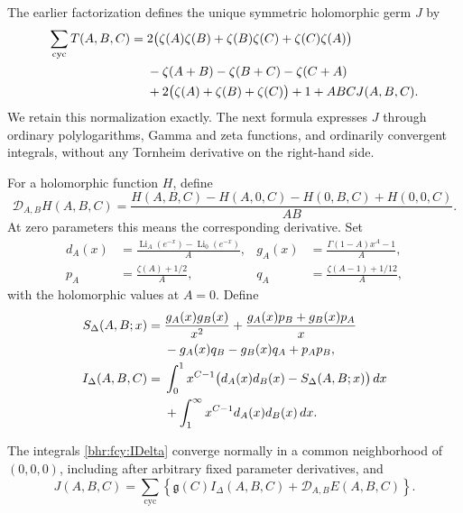 The earlier factorization defines the unique symmetric holomorphic
germ \(J\) by
\begin{align}
 \sum_{\mathrm{cyc}}T(A,B,C)={}&
 2\bigl(\zeta(A)\zeta(B)+\zeta(B)\zeta(C)+\zeta(C)\zeta(A)\bigr)
 \notag\\
 &-\zeta(A+B)-\zeta(B+C)-\zeta(C+A)\notag\\
 &+2\bigl(\zeta(A)+\zeta(B)+\zeta(C)\bigr)+1+ABCJ(A,B,C).
 \label{bhr:fcy:J}
\end{align}
We retain this normalization exactly. The next formula expresses
\(J\) through ordinary polylogarithms, Gamma and zeta functions,
and ordinarily convergent integrals, without any Tornheim derivative
on the right-hand side.

For a holomorphic function \(H\), define
\[
 \mathcal D_{A,B}H(A,B,C)=
 \frac{H(A,B,C)-H(A,0,C)-H(0,B,C)+H(0,0,C)}{AB}.
\]
At zero parameters this means the corresponding derivative. Set
\begin{align*}
 d_A(x)&=\frac{\operatorname{Li}_A(e^{-x})-\operatorname{Li}_0(e^{-x})}{A},&
 g_A(x)&=\frac{\Gamma(1-A)x^A-1}{A},\\
 p_A&=\frac{\zeta(A)+1/2}{A},&
 q_A&=\frac{\zeta(A-1)+1/12}{A},
\end{align*}
with the holomorphic values at \(A=0\). Define
\begin{align}
 S_\Delta(A,B;x)={}&\frac{g_A(x)g_B(x)}{x^2}
 +\frac{g_A(x)p_B+g_B(x)p_A}{x}\notag\\
 &-g_A(x)q_B-g_B(x)q_A+p_Ap_B,
 \label{bhr:fcy:SDelta}\\
 I_\Delta(A,B,C)={}&\int_0^1x^{C-1}
 \bigl(d_A(x)d_B(x)-S_\Delta(A,B;x)\bigr)\,dx\notag\\
 &+\int_1^\infty x^{C-1}d_A(x)d_B(x)\,dx.
 \label{bhr:fcy:IDelta}
\end{align}

\begin{theorem}
\label{bhr:fcy:generator}
The integrals \eqref{bhr:fcy:IDelta} converge normally in a common
neighborhood of \((0,0,0)\), including after arbitrary fixed
parameter derivatives, and
\begin{equation}\label{bhr:fcy:Jintegral}
 J(A,B,C)=\sum_{\mathrm{cyc}}
 \left\{\mathfrak g(C)I_\Delta(A,B,C)+\mathcal D_{A,B}E(A,B,C)\right\}.
\end{equation}
\end{theorem}

